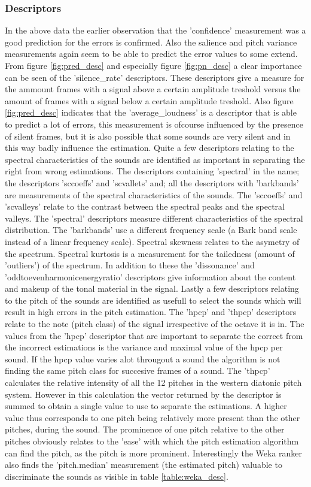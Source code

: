 \documentclass{proc}
\begin{document}
\subsubsection{Descriptors}
In the above data the earlier observation that the 'confidence' measurement was a good prediction for the errors is confirmed. Also the salience and pitch variance measurements again seem to be able to predict the error values to some extend. 
From figure \ref{fig:pred_desc} and especially figure \ref{fig:pn_desc} a clear importance can be seen of the 'silence\_rate' descriptors. These descriptors give a measure for the ammount frames with a signal above a certain amplitude treshold versus the amount of frames with a signal below a certain amplitude treshold. Also figure \ref{fig:pred_desc} indicates that the 'average\_loudness' is a descriptor that is able to predict a lot of errors, this measurement is ofcourse influenced by the presence of silent frames, but it is also possible that some sounds are very silent and in this way badly influence the estimation.
Quite a few descriptors relating to the spectral characteristics of the sounds are identified as important in separating the right from wrong estimations. The descriptors containing 'spectral' in the name; the descriptors 'sccoeffs' and 'scvallets' and; all the descriptors with 'barkbands' are measurements of the spectral characteristics of the sounds. The 'sccoeffs' and 'scvalleys' relate to the contrast between the spectral peaks and the spectral valleys. The 'spectral' descriptors measure different characteristics of the spectral distribution. The 'barkbands' use a different frequency scale (a Bark band scale instead of a linear frequency scale). Spectral skewness relates to the asymetry of the spectrum. Spectral kurtosis is a measurement for the tailedness (amount of 'outliers') of the spectrum. In addition to these the 'dissonance' and 'oddtoevenharmonicenergyratio' descriptors give information about the content and makeup of the tonal material in the signal. 
Lastly a few descriptors relating to the pitch of the sounds are identified as usefull to select the sounds which will result in high errors in the pitch estimation. The 'hpcp' and 'thpcp' descriptors relate to the note (pitch class) of the signal irrespective of the octave it is in. The values from the 'hpcp' descriptor that are important to separate the correct from the incorrect estimations is the variance and maximal value of the hpcp per sound. If the hpcp value varies alot througout a sound the algorithm is not finding the same pitch class for succesive frames of a sound. The 'thpcp' calculates the relative intensity of all the 12 pitches in the western diatonic pitch system. However in this calculation the vector returned by the descriptor is summed to obtain a single value to use to separate the estimations. A higher value thus corresponds to one pitch being relatively more present than the other pitches, during the sound. The prominence of one pitch relative to the other pitches obviously relates to the 'ease' with which the pitch estimation algorithm can find the pitch, as the pitch is more prominent. Interestingly the Weka ranker also finds the 'pitch.median' measurement (the estimated pitch) valuable to discriminate the sounds as visible in table \ref{table:weka_desc}.
\end{document}
